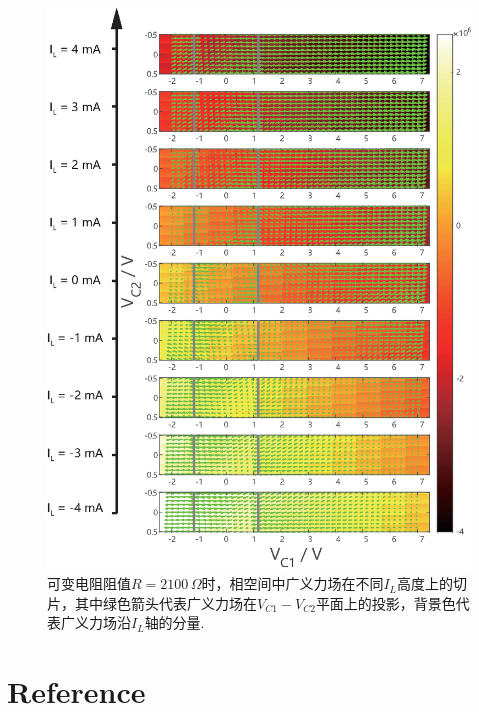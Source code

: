 \documentclass[a4paper, 10pt]{article}
\begin{document}
\begin{appendix}
\begin{figure}[H]
    \centering
    \includegraphics[width=\columnwidth]{Generalized-force-map-R=2100-modified.eps}
    \caption{可变电阻阻值$R=2100\,\Omega$时，相空间中广义力场在不同$I_L$高度上的切片，其中绿色箭头代表广义力场在$V_{C1}-V_{C2}$平面上的投影，背景色代表广义力场沿$I_L$轴的分量.}
    \label{Generalized-force-map-R=2100}
\end{figure}

\section{Reference}
\nocite{*}


\end{appendix}
\end{document}
